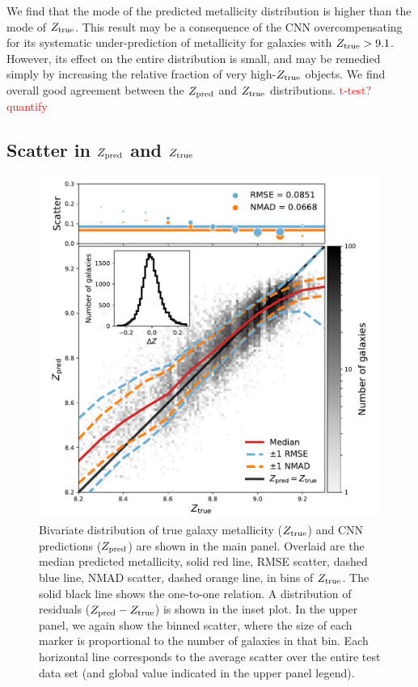 \documentclass[fleqn,usenatbib]{mnras}
\newcommand{\editorial}[1]{\textcolor{red}{#1}}
\begin{document}
We find that the mode of the predicted metallicity distribution is higher than the mode of $Z_{\rm true}$. This result may be a consequence of the CNN overcompensating for its systematic under-prediction of metallicity for galaxies with $Z_{\rm true} > 9.1$. However, its effect on the entire distribution is small, and may be remedied simply by increasing the relative fraction of very high-$Z_{\rm true}$ objects. We find overall good agreement between the $Z_{\rm pred}$ and $Z_{\rm true}$ distributions. \editorial{t-test? quantify}

\subsection{Scatter in $Z_{\rm pred}$ and $Z_{\rm true}$}
\begin{figure}
	\includegraphics[width=\columnwidth]{02-prediction_summary.pdf}
	\caption{\label{fig:predicting-metallicity}
		Bivariate distribution of true galaxy metallicity ($Z_{\rm true}$) and CNN predictions ($Z_{\rm pred}$) are shown in the main panel. Overlaid are the median predicted metallicity, solid red line, RMSE scatter, dashed blue line, NMAD scatter, dashed orange line, in bins of $Z_{\rm true}$. The solid black line shows the one-to-one relation. A distribution of residuals ($Z_{\rm pred} - Z_{\rm true}$) is shown in the inset plot. In the upper panel, we again show the binned scatter, where the size of each marker is proportional to the number of galaxies in that bin. Each horizontal line corresponds to the average scatter over the entire test data set (and global value indicated in the upper panel legend).}
\end{figure}
\end{document}
